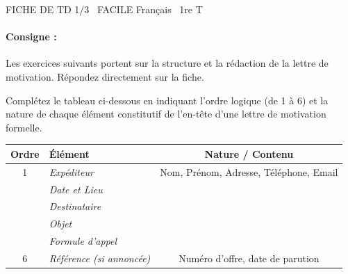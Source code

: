 \documentclass[11pt]{article}
\begin{document}
\begin{tcolorbox}[enhanced,colback=popink,colframe=popink,arc=10pt,boxrule=0pt,left=12pt,right=12pt,top=9pt,bottom=9pt]
{\color{white}\popxbold\small FICHE DE TD 1/3 \textbullet\ FACILE \hfill Français \textbullet\ 1re T\par}
\end{tcolorbox}
\vspace{4pt}
\paragraph{Consigne :} Les exercices suivants portent sur la structure et la rédaction de la lettre de motivation. Répondez directement sur la fiche.

\begin{exercice}
Complétez le tableau ci-dessous en indiquant l'ordre logique (de 1 à 6) et la nature de chaque élément constitutif de l'en-tête d'une lettre de motivation formelle.

\begin{tabular}{|c|p{5cm}|c|}
\hline
\textbf{Ordre} & \textbf{Élément} & \textbf{Nature / Contenu} \\
\hline
1 & \textit{Expéditeur} & Nom, Prénom, Adresse, Téléphone, Email \\
\hline
 & \textit{Date et Lieu} &  \\
\hline
 & \textit{Destinataire} &  \\
\hline
 & \textit{Objet} &  \\
\hline
 & \textit{Formule d'appel} &  \\
\hline
6 & \textit{Référence (si annoncée)} & Numéro d'offre, date de parution \\
\hline
\end{tabular}
\end{exercice}
\end{document}
